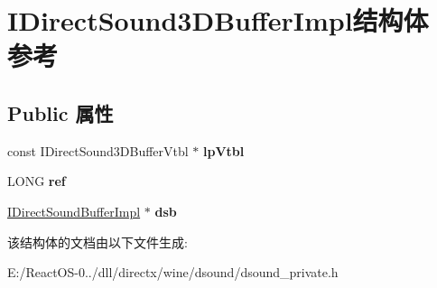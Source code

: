 \hypertarget{struct_i_direct_sound3_d_buffer_impl}{}\section{I\+Direct\+Sound3\+D\+Buffer\+Impl结构体 参考}
\label{struct_i_direct_sound3_d_buffer_impl}
\subsection*{Public 属性}
\begin{DoxyCompactItemize}
\item 
\mbox{\label{struct_i_direct_sound3_d_buffer_impl_aa8152588bb017e5d4b8ba8536a4ae0fb}} 
const I\+Direct\+Sound3\+D\+Buffer\+Vtbl $\ast$ {\bfseries lp\+Vtbl}
\item 
\mbox{\label{struct_i_direct_sound3_d_buffer_impl_a0ce23d9881bea9572d68152580f8e4ce}} 
L\+O\+NG {\bfseries ref}
\item 
\mbox{\label{struct_i_direct_sound3_d_buffer_impl_a51bdd2680d1c876d931ad4759cfc110b}} 
\hyperlink{struct_i_direct_sound_buffer_impl}{I\+Direct\+Sound\+Buffer\+Impl} $\ast$ {\bfseries dsb}
\end{DoxyCompactItemize}


该结构体的文档由以下文件生成\+:\begin{DoxyCompactItemize}
\item 
E\+:/\+React\+O\+S-\/0../dll/directx/wine/dsound/dsound\+\_\+private.\+h\end{DoxyCompactItemize}
